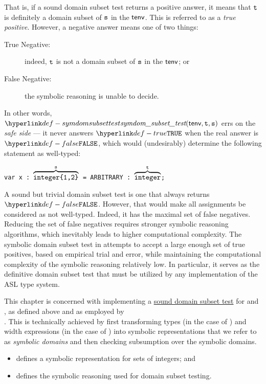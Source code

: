 That is, if a sound domain subset test returns a positive answer, it means that
$\texttt{t}$ is definitely a domain subset of $\texttt{s}$ in the \staticenvironmentterm{} $\textsf{tenv}$.
This is referred to as a \emph{true positive}.
However, a negative answer means one of two things:
\begin{description}
  \item[True Negative:] indeed, $\texttt{t}$ is not a domain subset of $\texttt{s}$ in the \staticenvironmentterm{} $\textsf{tenv}$; or
  \item[False Negative:] the symbolic reasoning is unable to decide.
\end{description}

In other words, $\symdomsubsettest(\tenv, \vt, \vs)$ errs on the \emph{safe side} ---
it never answers $\True$ when the real answer is $\False$, which would (undesirably)
determine the following statement as well-typed:
\begin{center}
\texttt{var x : $\overbrace{\texttt{integer\{1,2\}}}^{\texttt{s}}$ = ARBITRARY : $\overbrace{\texttt{integer}}^{\texttt{t}}$;}
\end{center}

A sound but trivial domain subset test is one that always returns $\False$.
However, that would make all assignments be considered as not well-typed.
Indeed, it has the maximal set of false negatives.
Reducing the set of false negatives requires stronger symbolic reasoning algorithms,
which inevitably leads to higher computational complexity.
%
The symbolic domain subset test in 
attempts to accept a large enough set of true positives, based on empirical trial and error,
while maintaining the computational complexity of the symbolic reasoning relatively low.
%
In particular, it serves as the definitive domain subset test that must be utilized
by any implementation of the ASL type system.

This chapter is concerned with implementing a \hyperlink{def-symdomsubsettest}{sound domain subset test}
for \integertypesterm{} and \bitvectortypesterm, as defined above and as employed by \\
.
This is technically achieved by first transforming types (in the case of \integertypesterm{})
and width expressions (in the case of \bitvectortypesterm{}) into symbolic representations
that we refer to as \emph{symbolic domains} and then checking subsumption over the symbolic domains.

\ChapterOutline
\begin{itemize}
  \item {} defines a symbolic representation for sets of integers; and
  \item {} defines the symbolic reasoning used for domain subset
        testing.
\end{itemize}

